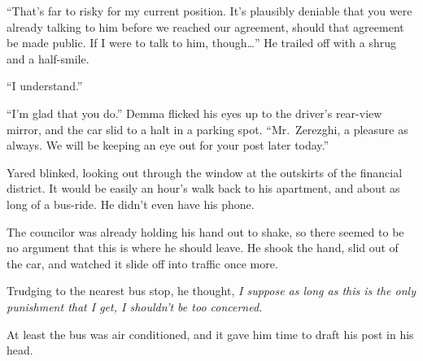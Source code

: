 ``That's far to risky for my current position. It's plausibly deniable that you were already talking to him before we reached our agreement, should that agreement be made public. If I were to talk to him, though\ldots{}'' He trailed off with a shrug and a half-smile.

``I understand.''

``I'm glad that you do.'' Demma flicked his eyes up to the driver's rear-view mirror, and the car slid to a halt in a parking spot. ``Mr.~Zerezghi, a pleasure as always. We will be keeping an eye out for your post later today.''

Yared blinked, looking out through the window at the outskirts of the financial district. It would be easily an hour's walk back to his apartment, and about as long of a bus-ride. He didn't even have his phone.

The councilor was already holding his hand out to shake, so there seemed to be no argument that this is where he should leave. He shook the hand, slid out of the car, and watched it slide off into traffic once more.

Trudging to the nearest bus stop, he thought, \emph{I suppose as long as this is the only punishment that I get, I shouldn't be too concerned.}

At least the bus was air conditioned, and it gave him time to draft his post in his head.

